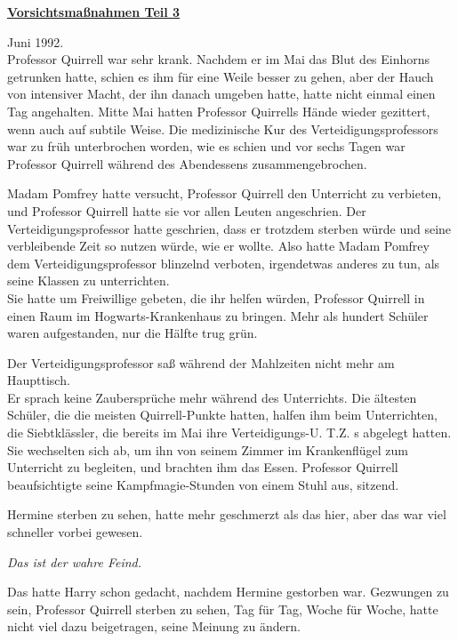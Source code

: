 

\hypertarget{vorsichtsmauxdfnahmen-teil-3}{%

\textbf{\uline{Vorsichtsmaßnahmen Teil 3}}

Juni 1992.\\ Professor Quirrell war sehr krank. Nachdem er im Mai das Blut des Einhorns getrunken hatte, schien es ihm für eine Weile besser zu gehen, aber der Hauch von intensiver Macht, der ihn danach umgeben hatte, hatte nicht einmal einen Tag angehalten. Mitte Mai hatten Professor Quirrells Hände wieder gezittert, wenn auch auf subtile Weise. Die medizinische Kur des Verteidigungsprofessors war zu früh unterbrochen worden, wie es schien und vor sechs Tagen war Professor Quirrell während des Abendessens zusammengebrochen.

Madam Pomfrey hatte versucht, Professor Quirrell den Unterricht zu verbieten, und Professor Quirrell hatte sie vor allen Leuten angeschrien. Der Verteidigungsprofessor hatte geschrien, dass er trotzdem sterben würde und seine verbleibende Zeit so nutzen würde, wie er wollte. Also hatte Madam Pomfrey dem Verteidigungsprofessor blinzelnd verboten, irgendetwas anderes zu tun, als seine Klassen zu unterrichten.\\ Sie hatte um Freiwillige gebeten, die ihr helfen würden, Professor Quirrell in einen Raum im Hogwarts-Krankenhaus zu bringen. Mehr als hundert Schüler waren aufgestanden, nur die Hälfte trug grün.

Der Verteidigungsprofessor saß während der Mahlzeiten nicht mehr am Haupttisch.\\ Er sprach keine Zaubersprüche mehr während des Unterrichts. Die ältesten Schüler, die die meisten Quirrell-Punkte hatten, halfen ihm beim Unterrichten, die Siebtklässler, die bereits im Mai ihre Verteidigungs-U. T.Z. s abgelegt hatten. Sie wechselten sich ab, um ihn von seinem Zimmer im Krankenflügel zum Unterricht zu begleiten, und brachten ihm das Essen. Professor Quirrell beaufsichtigte seine Kampfmagie-Stunden von einem Stuhl aus, sitzend.

Hermine sterben zu sehen, hatte mehr geschmerzt als das hier, aber das war viel schneller vorbei gewesen.

\emph{Das ist der wahre Feind.}

Das hatte Harry schon gedacht, nachdem Hermine gestorben war. Gezwungen zu sein, Professor Quirrell sterben zu sehen, Tag für Tag, Woche für Woche, hatte nicht viel dazu beigetragen, seine Meinung zu ändern.

}
